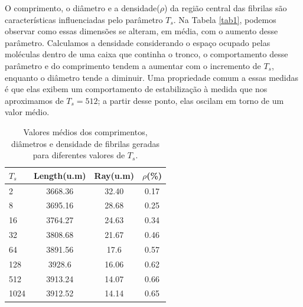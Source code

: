 \documentclass[11pt,a4paper]{article} %
\begin{document}
     
        O comprimento, o diâmetro e a densidade(\(\rho\)) da região central das fibrilas são características influenciadas pelo  
        parâmetro \(T_{s}\). Na Tabela \ref{tab1}, podemos observar como essas dimensões se alteram, em média, com o  
        aumento desse parâmetro. Calculamos a densidade considerando o espaço ocupado pelas moléculas dentro de uma caixa 
        que continha o tronco, o comportamento desse parâmetro e do comprimento tendem a aumentar com o incremento de \(T_{s}\), enquanto  
        o diâmetro tende a diminuir. Uma propriedade comum a essas medidas é que elas exibem um comportamento de  
        estabilização à medida que nos aproximamos de \(T_{s} = 512\); a partir desse ponto, elas oscilam em torno de um  
        valor médio. 

 
        \begin{table}[H]
            \caption{Valores médios dos comprimentos, diâmetros e densidade de fibrilas geradas para diferentes valores de \(T_{s}\).}
            \centering  %
            \begin{tabular}{lccc}
            \hline
            \textbf{$T_{s}$} & \multicolumn{1}{c}{\textbf{Length(u.m)}} & \textbf{Ray(u.m)} & \textbf{\(\rho\)(\%)} \\ \hline
            2                & 3668.36                                   & 32.40             & 0.17                  \\
            8                & 3695.16                                   & 28.68             & 0.25                  \\
            16               & 3764.27                                   & 24.63             & 0.34                  \\
            32               & 3808.68                                   & 21.67             & 0.46                  \\
            64               & 3891.56                                   & 17.6              & 0.57                  \\
            128              & 3928.6                                    & 16.06             & 0.62                  \\
            512              & 3913.24                                   & 14.07             & 0.66                  \\
            1024             & 3912.52                                   & 14.14             & 0.65                  \\

\end{tabular}
\end{table}
\end{document}
